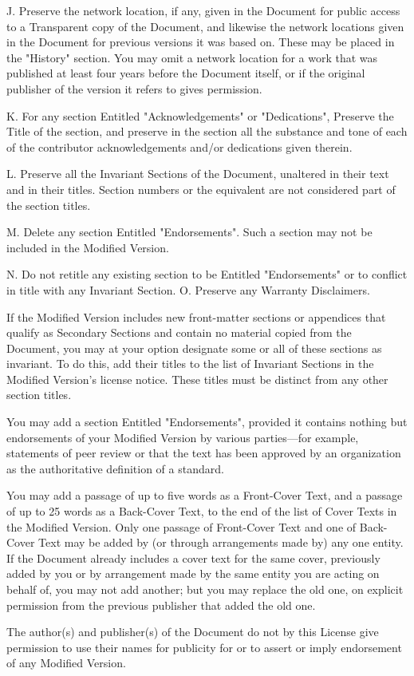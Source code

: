J. Preserve the network location, if any, given in the Document for public access to a Transparent copy of the Document, and likewise the network locations given in the Document for previous versions it was based on. These may be placed in the "History" section. You may omit a network location for a work that was published at least four years before the Document itself, or if the original publisher of the version it refers to gives permission. \par
K. For any section Entitled "Acknowledgements" or "Dedications", Preserve the Title of the section, and preserve in the section all the substance and tone of each of the contributor acknowledgements and/or dedications given therein. \par
L. Preserve all the Invariant Sections of the Document, unaltered in their text and in their titles. Section numbers or the equivalent are not considered part of the section titles. \par
M. Delete any section Entitled "Endorsements". Such a section may not be included in the Modified Version. \par
N. Do not retitle any existing section to be Entitled "Endorsements" or to conflict in title with any Invariant Section. 
O. Preserve any Warranty Disclaimers.\par
If the Modified Version includes new front-matter sections or appendices that qualify as Secondary Sections and contain no material copied from the Document, you may at your option designate some or all of these sections as invariant. To do this, add their titles to the list of Invariant Sections in the Modified Version's license notice. These titles must be distinct from any other section titles.\par
You may add a section Entitled "Endorsements", provided it contains nothing but endorsements of your Modified Version by various parties—for example, statements of peer review or that the text has been approved by an organization as the authoritative definition of a standard.\par
You may add a passage of up to five words as a Front-Cover Text, and a passage of up to 25 words as a Back-Cover Text, to the end of the list of Cover Texts in the Modified Version. Only one passage of Front-Cover Text and one of Back-Cover Text may be added by (or through arrangements made by) any one entity. If the Document already includes a cover text for the same cover, previously added by you or by arrangement made by the same entity you are acting on behalf of, you may not add another; but you may replace the old one, on explicit permission from the previous publisher that added the old one.\par
The author(s) and publisher(s) of the Document do not by this License give permission to use their names for publicity for or to assert or imply endorsement of any Modified Version.
